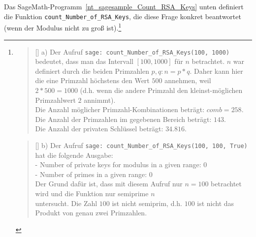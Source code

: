 \begin{refsegment}
\newpage
\noindent Das SageMath-Programm~\ref{nt_sagesample_Count_RSA_Keys} unten
definiert die Funktion \verb#count_Number_of_RSA_Keys#, die diese Frage konkret
beantwortet (wenn der Modulus nicht zu groß ist).\footnote{%
\newlength{\saveleftmargini}
\setlength{\saveleftmargini}{\leftmargini}
\setlength{\leftmargini}{0em}%
\settowidth{\versewidth}{xxxxx xxxxx xxxxx xxxxx xxxxx xxxxx xxxxx xxxxx xxxxx xxxxx xxxxx xxxxx xxxxx xxxxx xxxxx xxxxx xxxxx xxxxx}
\vspace{-\baselineskip} %
\begin{verse}[\versewidth]
 a) Der Aufruf \verb#sage: count_Number_of_RSA_Keys(100, 1000)# bedeutet, dass
man das Intervall $[100, 1000]$ für $n$ betrachtet.
$n$ war definiert durch die beiden Primzahlen $p, q: n = p*q$.
\verselinebreak Daher kann hier die eine Primzahl höchstens den Wert $500$ annehmen, weil
$2 * 500 =1000$ (d.h. wenn die andere Primzahl den kleinst-möglichen Primzahlwert $2$
annimmt).\\
\vin Die Anzahl möglicher Primzahl-Kombinationen beträgt: $comb = 258$.\\
\vin Die Anzahl der Primzahlen im gegebenen Bereich beträgt: $143$.\\
\vin Die Anzahl der privaten Schlüssel beträgt: $34.816$.
\end{verse}
\begin{verse}[\versewidth]
 b) Der Aufruf \verb#sage: count_Number_of_RSA_Keys(100, 100, True)#
hat die folgende Ausgabe:\\
\vin    - Number of private keys for modulus in a given range: 0\\
\vin    - Number of primes in a given range: 0\\
\vin   Der Grund dafür ist, dass mit diesem Aufruf nur $n=100$ betrachtet wird und
   die Funktion nur semiprime $n$\\ %
\vin untersucht. Die Zahl $100$ ist nicht
   semiprim, d.h. $100$ ist nicht das Produkt von genau zwei Primzahlen.
\end{verse}
\setlength{\leftmargini}{\saveleftmargini}%
}



\end{refsegment}
